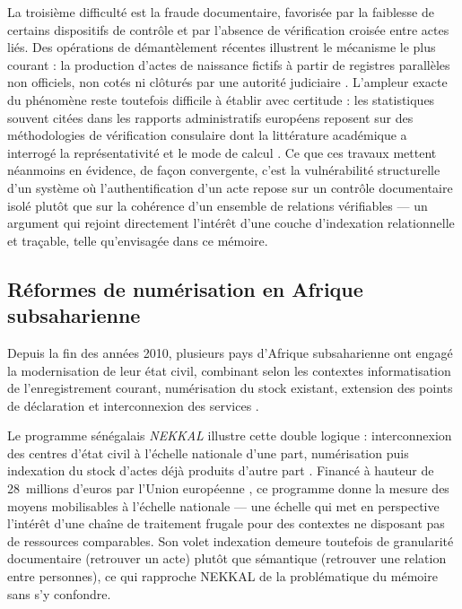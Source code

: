 La troisième difficulté est la fraude documentaire, favorisée par la faiblesse de certains dispositifs de contrôle et par l'absence de vérification croisée entre actes liés.
Des opérations de démantèlement récentes illustrent le mécanisme le plus courant : la production d'actes de naissance fictifs à partir de registres parallèles non officiels, non cotés ni clôturés par une autorité judiciaire \cite{sentv2025reseaufraude}.
L'ampleur exacte du phénomène reste toutefois difficile à établir avec certitude : les statistiques souvent citées dans les rapports administratifs européens reposent sur des méthodologies de vérification consulaire dont la littérature académique a interrogé la représentativité et le mode de calcul \cite{ferre2010soupconfraude}.
Ce que ces travaux mettent néanmoins en évidence, de façon convergente, c'est la vulnérabilité structurelle d'un système où l'authentification d'un acte repose sur un contrôle documentaire isolé plutôt que sur la cohérence d'un ensemble de relations vérifiables --- un argument qui rejoint directement l'intérêt d'une couche d'indexation relationnelle et traçable, telle qu'envisagée dans ce mémoire.

\subsection{Réformes de numérisation en Afrique subsaharienne}
\label{sec:reformes-numerisation}

Depuis la fin des années 2010, plusieurs pays d'Afrique subsaharienne ont engagé la modernisation de leur état civil, combinant selon les contextes informatisation de l'enregistrement courant, numérisation du stock existant, extension des points de déclaration et interconnexion des services \cite{unionAfricaine2019numerisation,uneca2024crvs}.

Le programme sénégalais \textit{NEKKAL} illustre cette double logique : interconnexion des centres d'état civil à l'échelle nationale d'une part, numérisation puis indexation du stock d'actes déjà produits d'autre part \cite{civipol2023nekkal}. Financé à hauteur de 28~millions d'euros par l'Union européenne \cite{eeas2025nekkalfinancement}, ce programme donne la mesure des moyens mobilisables à l'échelle nationale --- une échelle qui met en perspective l'intérêt d'une chaîne de traitement frugale pour des contextes ne disposant pas de ressources comparables. Son volet indexation demeure toutefois de granularité documentaire (retrouver un acte) plutôt que sémantique (retrouver une relation entre personnes), ce qui rapproche NEKKAL de la problématique du mémoire sans s'y confondre.

